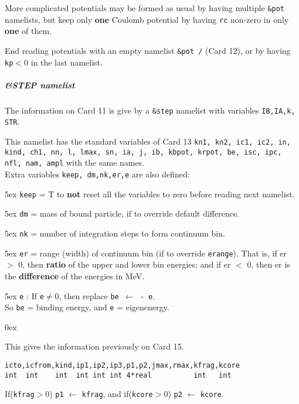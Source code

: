 \documentclass[11pt]{article}
\begin{document}
\bigskip
More complicated potentials  may be formed as usual by having multiple
{\tt \&pot} namelists, but keep only {\bf one} Coulomb potential by having
{\tt rc} non-zero in only {\bf one} of them.

\bigskip
End reading potentials with an empty namelist {\tt \&pot /} (Card 12),
or by having {\tt kp}$<$0 in the last namelist.

\subparagraph*{\&STEP namelist}

The information on Card 11 is give by a {\tt \&step} namelist with variables
{\tt IB,IA,k, STR}.

This namelist has the standard variables of Card 13
{\tt    kn1, kn2, ic1, ic2, in, kind, ch1, nn, l, lmax, sn,
        ia, j, ib, kbpot, krpot, be, isc, ipc, nfl, nam, ampl}
with the same names.\\

\bigskip
Extra variables {\tt keep, dm,nk,er,e} are also defined:

\hangindent 5ex
{\tt keep} = T to {\bf not} reset all the variables to zero before reading next namelist.

\hangindent 5ex
{\tt dm} = mass of bound particle, if to override default difference.

\hangindent 5ex
{\tt nk} = number of integration steps to form continuum bin.

\hangindent 5ex
{\tt er} = range (width) of continuum bin (if to override {\tt erange}).
That is, if er $>$ 0, then {\bf ratio} of the upper and lower bin
energies; and if er $<$ 0, then er is the  {\bf difference} of the energies in MeV.

\hangindent 5ex
{\tt e} : If {\tt e}$\ne$0, then replace {\tt be $\leftarrow$ - e}.\\
        So {\tt be} = binding energy, and {\tt e} = eigenenergy.

\hangindent 0ex


This gives the information previously on Card 15.
\begin{verbatim}
icto,icfrom,kind,ip1,ip2,ip3,p1,p2,jmax,rmax,kfrag,kcore
int  int    int  int int int 4*real          int   int
\end{verbatim}
If({\tt kfrag}$>$0) {\tt p1} $\leftarrow$ {\tt kfrag}, and
if({\tt kcore}$>$0) {\tt p2} $\leftarrow$ {\tt kcore}.
\end{document}
